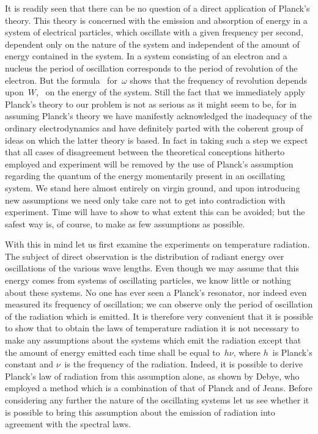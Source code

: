 It is readily seen that there can be no question of a direct application
of Planck's theory. This theory is concerned with the emission
and absorption of energy in a system of electrical particles, which
oscillate with a given frequency per second, dependent only on the
nature of the system and independent of the amount of energy
contained in the system. In a system consisting of an electron and
a nucleus the period of oscillation corresponds to the period of
revolution of the electron. But the formula~ for~$\omega$ shows that the
frequency of revolution depends upon~$W$, \ie\ on the energy of the
system. Still the fact that we  immediately apply Planck's
theory to our problem is not as serious as it might seem to be, for
in assuming Planck's theory we have manifestly acknowledged the
inadequacy of the ordinary electrodynamics and have definitely
parted with the coherent group of ideas on which the latter theory
is based. In fact in taking such a step we  expect that all
cases of disagreement between the theoretical conceptions hitherto
employed and experiment will be removed by the use of Planck's
assumption regarding the quantum of the energy momentarily
present in an oscillating system. We stand here almost entirely on
virgin ground, and upon introducing new assumptions we need only
take care not to get into contradiction with experiment. Time will
have to show to what extent this can be avoided; but the safest
way is, of course, to make as few assumptions as possible.

With this in mind let us first examine the experiments on
temperature radiation. The subject of direct observation is the
distribution of radiant energy over oscillations of the various wave
lengths. Even though we may assume that this energy comes from
systems of oscillating particles, we know little or nothing about
these systems. No one has ever seen a Planck's resonator, nor
indeed even measured its frequency of oscillation; we can observe
only the period of oscillation of the radiation which is emitted. It
is therefore very convenient that it is possible to show that to
obtain the laws of temperature radiation it is not necessary to
make any assumptions about the systems which emit the radiation
except that the amount of energy emitted each time shall be equal
to~$h\nu$, where $h$~is Planck's constant and $\nu$~is the frequency of the
radiation. Indeed, it is possible to derive Planck's law of radiation
from this assumption alone, as shown by Debye, who employed a
method which is a combination of that of Planck and of Jeans.
Before considering any further the nature of the oscillating systems
let us see whether it is possible to bring this assumption about the
emission of radiation into agreement with the spectral laws.

